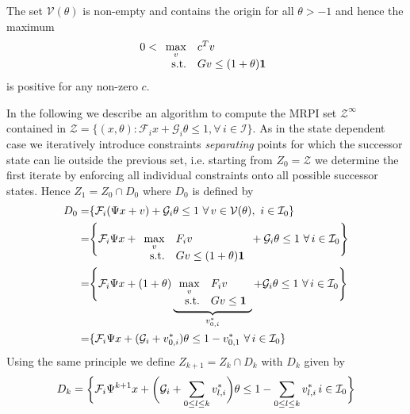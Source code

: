 \begin{rem}
The set $\mathcal V(\theta)$ is non-empty and contains the origin for all $\theta>-1$ and hence the 
maximum
%
\begin{equation*}
0<\begin{array}[t]{rl}
\displaystyle\max_v & c^T v\\
\text{s.t.}& Gv \leq (1+\theta){\bf{1}}
\end{array}
\end{equation*}
%
is positive for any non-zero $c$.
\end{rem}
%
In the following we describe an algorithm to compute the MRPI set $\mathcal Z^\infty$ contained in 
$\mathcal Z = \{(x,\theta):\mathcal F_i x+\mathcal G_i\theta \leq 1,\forall\, i\in\mathcal I\}$.
%
As in the state dependent case we iteratively introduce constraints \emph{separating} points
for which the successor state can lie outside the previous set, i.e. starting from $Z_0 = \mathcal Z$
we determine the first iterate by enforcing all individual constraints onto all possible successor states.
%
Hence $Z_1=Z_0\cap D_0$ where $D_0$ is defined by
%
\begin{equation}
\begin{split}
	D_0 =& \{\mathcal F_i(\Psi x+v) + \mathcal G_i\theta \leq 1 \ \forall\, v\in\mathcal V(\theta), \ i\in\mathcal I_0\}\\
	=&\Biggl\{\mathcal F_i\Psi x + \begin{array}[t]{rl}\displaystyle\max_v& F_i v \\ \text{s.t.}& Gv \leq 
	(1+\theta){\bf{1}} \end{array}
	 + \mathcal G_i \theta \leq 1 \ \forall\, i\in\mathcal I_0\Biggr\}\\
	=&\Biggl\{\mathcal F_i\Psi x + (1+\theta)\underbrace{\begin{array}[t]{rl}\displaystyle\max_v& F_i v \\ 
	\text{s.t.}& Gv \leq {\bf{1}}\end{array}}_{v_{0,i}^\ast}
	 + \mathcal G_i \theta \leq 1 \ \forall\, i\in\mathcal I_0\Biggr\}\\
	=&\{\mathcal F_i\Psi x + (\mathcal G_i + v_{0,i}^\ast)\theta \leq 1 - v_{0,1}^\ast \ \forall \, i\in\mathcal I_0
	\}
\end{split}\end{equation}
%
Using the same principle we define $Z_{k+1}=Z_k\cap D_k$ with $D_k$ given by
%
\begin{equation}\label{eq:parametrised:Dk}\small
	D_k = \biggl\{\mathcal F_i\Psi^{k+1}x+ \biggl(\mathcal G_i +\sum_{0\leq l\leq k} v_{l,i}^\ast\biggr)\theta \leq 1 
	- \sum_{0\leq l\leq k} v_{l,i}^\ast\, i\in\mathcal I_0\biggr\}
\end{equation}
